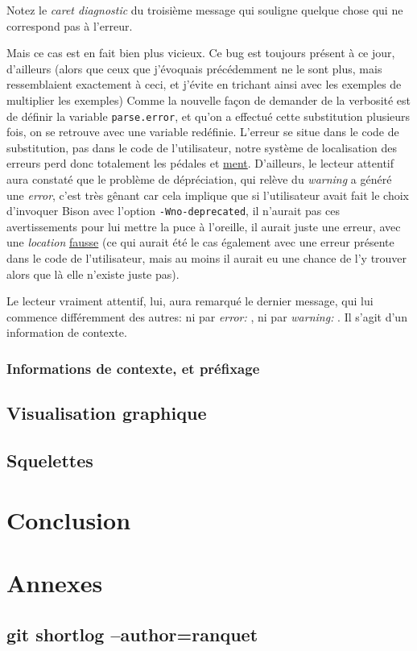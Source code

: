 \documentclass[a4paper,11pt,twoside,final]{article}
\begin{document}
  Notez le \textit{caret diagnostic} du troisième message qui souligne quelque
  chose qui ne correspond pas à l'erreur.

  Mais ce cas est en fait bien plus vicieux. Ce bug est toujours présent à ce
  jour, d'ailleurs (alors que ceux que j'évoquais précédemment ne le sont plus,
  mais ressemblaient exactement à ceci, et j'évite en trichant ainsi avec les
  exemples de multiplier les exemples) Comme la nouvelle façon de demander de
  la verbosité est de définir la variable \texttt{parse.error}, et qu'on a
  effectué cette substitution plusieurs fois, on se retrouve avec une variable
  redéfinie.  L'erreur se situe dans le code de substitution, pas dans le code
  de l'utilisateur, notre système de localisation des erreurs perd donc
  totalement les pédales et \underline{ment}. D'ailleurs, le lecteur attentif
  aura constaté que le problème de dépréciation, qui relève du \textit{warning}
  a généré une \textit{error}, c'est très gênant car cela implique que si
  l'utilisateur avait fait le choix d'invoquer Bison avec l'option
  \texttt{-Wno-deprecated}, il n'aurait pas ces avertissements pour lui mettre
  la puce à l'oreille, il aurait juste une erreur, avec une \textit{location}
  \underline{fausse} (ce qui aurait été le cas également avec une erreur
  présente dans le code de l'utilisateur, mais au moins il aurait eu une chance
  de l'y trouver alors que là elle n'existe juste pas).

  Le lecteur vraiment attentif, lui, aura remarqué le dernier message, qui lui
  commence différemment des autres: ni par \textit{error: }, ni par
  \textit{warning: }. Il s'agit d'un information de contexte.

  \subsubsection{Informations de contexte, et préfixage}

  \subsection{Visualisation graphique}

  \subsection{Squelettes}

  \cleardoublepage
  \section{Conclusion}

  \cleardoublepage
  \section{Annexes}

  \subsection{git shortlog --author=ranquet}
  \begin{adjustwidth}{-2cm}{-2cm}
  \end{adjustwidth}

  \cleardoublepage
  \cleardoublepage
\end{document}
